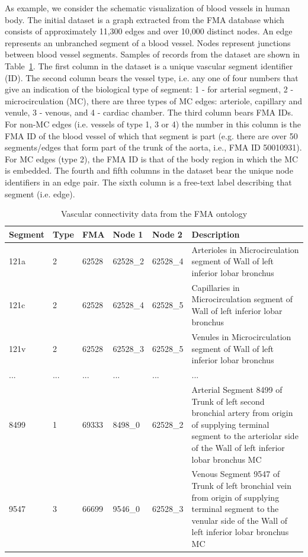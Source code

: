As example, we consider the schematic visualization of blood vessels in human body.
The initial dataset is a graph extracted from the FMA database which consists of approximately 11,300 edges and over 10,000 distinct nodes.
An edge represents an unbranched segment of a blood vessel. Nodes represent junctions between blood vessel segments.
Samples of records from the dataset are shown in Table~\ref{tab:vascular-connectivity}. The first column in the dataset is a unique vascular segment identifier (ID). The second column bears the vessel type, i.e. any one of four numbers that give an indication of the biological type of segment:
1 - for arterial segment, 2 - microcirculation (MC), there are three types of MC edges: arteriole, capillary and venule, 3 - venous, and 4 - cardiac chamber.
The third column bears FMA IDs. For non-MC edges (i.e. vessels of type 1, 3 or 4) the number in this column is the FMA ID of the blood vessel of
which that segment is part (e.g. there are over 50 segments/edges that form part of the trunk of the aorta, i.e., FMA ID 50010931). For MC edges (type 2), the FMA ID is that of the body region in which the MC is embedded. The fourth and fifth columns in the dataset bear the unique node identifiers in an edge pair.
The sixth column is a free-text label describing that segment (i.e. edge).

\begin{table}
\caption{Vascular connectivity data from the FMA ontology}
\begin{tabular}{|l|l|l|l|l|p{7cm}|}
  \hline
  Segment & Type & FMA & Node 1 & Node 2 & Description \\
  \hline
  121a & 2 & 62528 & 62528\_2 & 62528\_4 & Arterioles in Microcirculation segment of Wall of left inferior lobar bronchus \\
  121c & 2 & 62528 & 62528\_4 & 62528\_5 & Capillaries in Microcirculation segment of Wall of left inferior lobar bronchus\\
  121v & 2 & 62528 & 62528\_3 & 62528\_5 & Venules in Microcirculation segment of Wall of left inferior lobar bronchus\\
  ... &... & ...   & ...      & ...      & ...\\
  8499 & 1 & 69333 & 8498\_0 & 62528\_2  & Arterial Segment 8499 of Trunk
of left second bronchial artery from origin of supplying terminal segment
to the arteriolar side of the Wall of left inferior lobar bronchus
MC\\
  9547 & 3 & 66699 & 9546\_0 & 62528\_3 & Venous Segment 9547 of Trunk of
left bronchial vein from origin of supplying terminal segment to the
venular side of the Wall of left inferior lobar bronchus MC \\
  \hline
\end{tabular}
\label{tab:vascular-connectivity}
\end{table}

